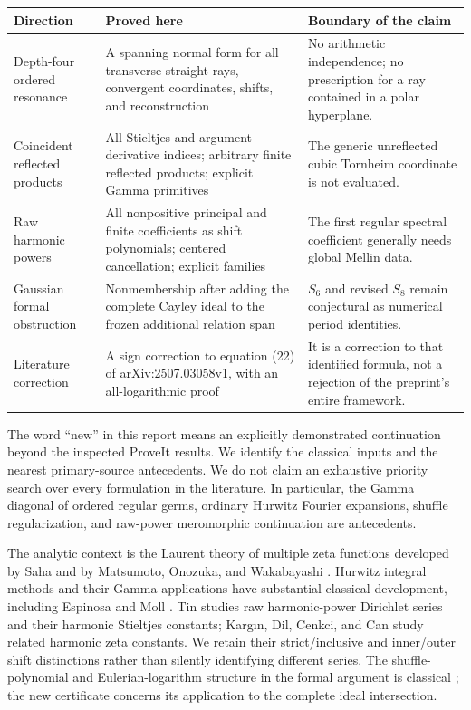 \documentclass[11pt,a4paper]{article}
\numberwithin{equation}{section}
\theoremstyle{definition}
\theoremstyle{remark}
\begin{document}
\begin{longtable}{@{}p{}p{}p{}@{}}
\toprule
Direction & Proved here & Boundary of the claim\\
\midrule
\endhead
Depth-four ordered resonance & A spanning normal form for all transverse
straight rays, convergent coordinates, shifts, and reconstruction &
No arithmetic independence; no prescription for a ray contained in a
polar hyperplane.\\[5pt]
Coincident reflected products & All Stieltjes and argument derivative
indices; arbitrary finite reflected products; explicit Gamma primitives &
The generic unreflected cubic Tornheim coordinate is not evaluated.\\[5pt]
Raw harmonic powers & All nonpositive principal and finite coefficients
as shift polynomials; centered cancellation; explicit families &
The first regular spectral coefficient generally needs global Mellin
data.\\[5pt]
Gaussian formal obstruction & Nonmembership after adding the complete
Cayley ideal to the frozen additional relation span &
$S_6$ and revised $S_8$ remain conjectural as numerical period identities.\\[5pt]
Literature correction & A sign correction to equation (22) of
arXiv:2507.03058v1, with an all-logarithmic proof &
It is a correction to that identified formula, not a rejection of the
preprint's entire framework.\\
\bottomrule
\end{longtable}

The word ``new'' in this report means an explicitly demonstrated
continuation beyond the inspected ProveIt results. We identify the
classical inputs and the nearest primary-source antecedents. We do not
claim an exhaustive priority search over every formulation in the
literature. In particular, the Gamma diagonal of ordered regular germs,
ordinary Hurwitz Fourier expansions, shuffle regularization, and
raw-power meromorphic continuation are antecedents.

The analytic context is the Laurent theory of multiple zeta functions
developed by Saha \cite{Saha} and by Matsumoto, Onozuka, and Wakabayashi
\cite{MOW}. Hurwitz integral methods and their Gamma applications have
substantial classical development, including Espinosa and Moll
\cite{EspinosaMoll1,EspinosaMoll2}. Tin \cite{hp:Tin2025} studies raw
harmonic-power Dirichlet series and their harmonic Stieltjes constants;
Karg\i n, Dil, Cenkci, and Can \cite{Kargin} study related harmonic zeta
constants. We retain their strict/inclusive and inner/outer shift
distinctions rather than silently identifying different series.
The shuffle-polynomial and Eulerian-logarithm structure in the formal
argument is classical \cite{gf:Radford,gf:Patras}; the new certificate
concerns its application to the complete ideal intersection.
\end{document}
